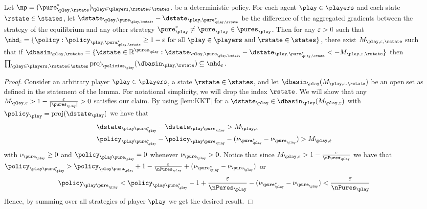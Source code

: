 \begin{lemma}\label{lem:equivalence} Let $\np = (\pure^*_{\play,\rstate})_{\play\in\players, \rstate\in\states}$, be a  deterministic policy. For each agent $\play\in\players$ and each state $\rstate\in\states$, let $\dstate_{\play,\pure_{\play,\rstate}} -\dstate_{\play,\pure^*_{\play,\rstate}}$ be the difference of the aggregated gradients between the strategy of the equilibrium and any other strategy $\pure_\play^*\neq \pure_{\play}\in\pures_\play$. Then for any $\varepsilon >0 $ such that $\nhd_{\eps} = \braces{\policy: \policy_{\play,\pure_{\play,\rstate}^*}\geq 1-\eps \text{ for all } \play\in\players \text{ and } \rstate\in\states}$, there exist $M_{\play,\eps,\rstate}$ such that if $\dbasin_{\play,\rstate} = \braces{\dstate\in\R^{\pures_\play}: \dstate_{\play,\pure_{\play,\rstate}} -\dstate_{\play,\pure^*_{\play,\rstate}} < - M_{\play,\eps,\rstate}}$  then $\prod_{\play\in\players,\rstate\in\states}\proj_{\policies_{\play}}\parens{\dbasin_{\play,\rstate}}\subseteq \nhd_{\eps}$.
\end{lemma}
\begin{proof}

Consider an arbitrary player $\play\in\players$, a state $\rstate\in\states$, and let $\dbasin_\play\parens{M_{\play,\eps,\rstate}}$ be an open set as defined in the statement of the lemma. For notational simplicity, we will drop the index $\rstate$.
We will show that any $M_{\play,\eps}> 1-\frac{\eps}{|\pures_\play|}>0 $ satisfies our claim.
By  using \cref{lem:KKT} for a $\dstate_\play\in \dbasin_\play\parens{M_{\play,\eps}}$ with $\policy_\play=\proj\parens{\dstate_\play}$ we have that 
\begin{equation}
\begin{aligned}
    &\dstate_{\play\pure_\play^*}-\dstate_{\play\pure_\play}>M_{\play,\eps}\\
    &  {\policy_{\play\pure_\play^*}}-{\policy_{\play\pure_\play}} - (\nu_{\pure^*_\play}-\nu_{\pure_\play}) > M_{\play,\eps}\label{eq:contradiction}
\end{aligned}
\end{equation}
with $\nu_{\pure_\play} \geq 0$ and $\policy_{\play\pure_\play} =0$ whenever $\nu_{\pure_\play} >0$.
Notice that since $M_{\play,\eps} >1-\frac{\eps}{\nPures_{\play}}$  we  have that ${\policy_{\play\pure_\play^*}}>{\policy_{\play\pure_\play}} + 1 - \frac{\eps}{\nPures_{\play}} 
+ (\nu_{\pure^*_\play}-\nu_{\pure_\play})$ or 
\begin{equation}
  {\policy_{\play\pure_\play}}<   {\policy_{\play\pure_\play^*}} - 1 + \frac{\eps}{\nPures_{\play}} 
- (\nu_{\pure^*_\play}-\nu_{\pure_\play}) <\frac{\eps}{\nPures_{\play}} 
\end{equation}
Hence, by summing over all strategies of player $\play$ we get the desired result.
\end{proof}


